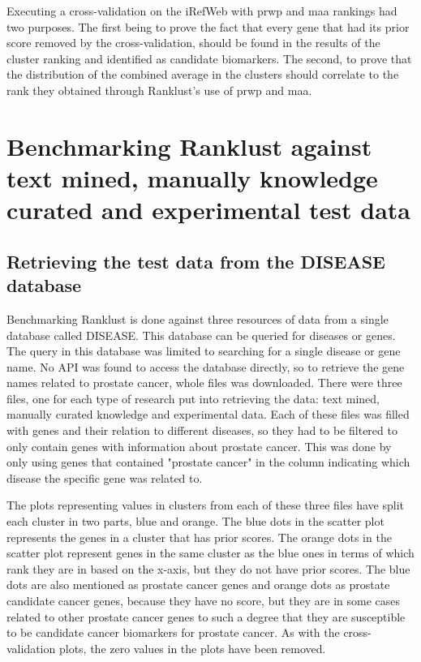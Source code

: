 Executing a cross-validation on the iRefWeb with \gls{prwp} and \gls{maa}
rankings had two purposes. The first being to prove the fact that every gene
that had its prior score removed by the cross-validation, should be found in the
results of the cluster ranking and identified as candidate biomarkers. The
second, to prove that the distribution of the combined average in the clusters
should correlate to the rank they obtained through Ranklust's use of \gls{prwp}
and \gls{maa}.

\chapter{Benchmarking Ranklust against text mined, manually knowledge curated and experimental test data}
\section{Retrieving the test data from the DISEASE database}
Benchmarking Ranklust is done against three resources of data from a single
database called DISEASE\cite{jensen}. This database can be queried for diseases
or genes. The query in this database was limited to searching for a single
disease or gene name. No API was found to access the database directly, so to
retrieve the gene names related to prostate cancer, whole files was downloaded.
There were three files, one for each type of research put into retrieving the
data: text mined, manually curated knowledge and experimental data. Each of
these files was filled with genes and their relation to different diseases, so
they had to be filtered to only contain genes with information about prostate
cancer. This was done by only using genes that contained "prostate cancer" in
the column indicating which disease the specific gene was related to.

The plots representing values in clusters from each of these three files have
split each cluster in two parts, blue and orange. The blue dots in the scatter
plot represents the genes in a cluster that has prior scores. The orange dots in
the scatter plot represent genes in the same cluster as the blue ones in terms
of which rank they are in based on the x-axis, but they do not have prior
scores. The blue dots are also mentioned as prostate cancer genes and orange
dots as prostate candidate cancer genes, because they have no score, but they
are in some cases related to other prostate cancer genes to such a degree that
they are susceptible to be candidate cancer biomarkers for prostate cancer. As
with the cross-validation plots, the zero values in the plots have been removed.

